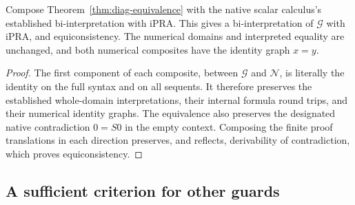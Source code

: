 \begin{proposition}
\label{prop:diag-ipra}
Compose Theorem~\ref{thm:diag-equivalence} with the native scalar
calculus's established bi-interpretation with iPRA.  This gives a
bi-interpretation of $\mathcal G$ with iPRA, and equiconsistency.
The numerical domains and interpreted equality are unchanged, and both
numerical composites have the identity graph $x=y$.
\end{proposition}
\begin{proof}
The first component of each composite, between $\mathcal G$ and
$\mathcal N$, is literally the identity on the full syntax and on all
sequents.  It therefore preserves the established whole-domain
interpretations, their internal formula round trips, and their numerical
identity graphs.  The equivalence also preserves the designated native
contradiction $0=S0$ in the empty context.  Composing the finite proof
translations in each direction preserves, and reflects, derivability of
contradiction, which proves equiconsistency.
\end{proof}

\subsection{A sufficient criterion for other guards}

